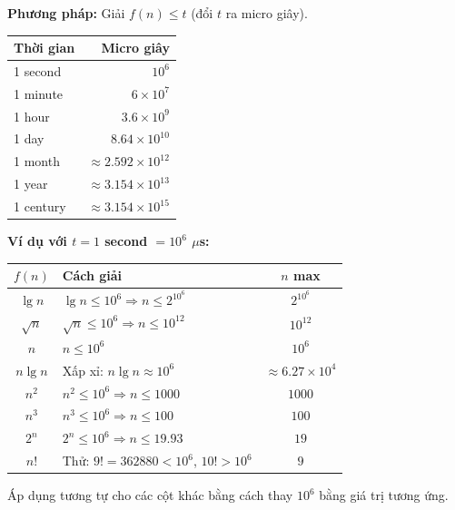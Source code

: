 \documentclass[12pt,a4paper]{article}
\begin{document}
\textbf{Phương pháp:} Giải $f(n) \leq t$ (đổi $t$ ra micro giây).

\begin{notebox}
\begin{center}
\renewcommand{\arraystretch}{1.2}
\begin{tabular}{|l|r|}
\hline
\textbf{Thời gian} & \textbf{Micro giây} \\
\hline
1 second & $10^6$ \\
1 minute & $6 \times 10^7$ \\
1 hour & $3.6 \times 10^9$ \\
1 day & $8.64 \times 10^{10}$ \\
1 month & $\approx 2.592 \times 10^{12}$ \\
1 year & $\approx 3.154 \times 10^{13}$ \\
1 century & $\approx 3.154 \times 10^{15}$ \\
\hline
\end{tabular}
\end{center}
\end{notebox}

\textbf{Ví dụ với $t = 1$ second $= 10^6$ $\mu$s:}

\begin{center}
\renewcommand{\arraystretch}{1.4}
\begin{tabular}{|c|l|c|}
\hline
$f(n)$ & \textbf{Cách giải} & $n$ max \\
\hline
$\lg n$ & $\lg n \leq 10^6 \Rightarrow n \leq 2^{10^6}$ & $2^{10^6}$ \\
\hline
$\sqrt{n}$ & $\sqrt{n} \leq 10^6 \Rightarrow n \leq 10^{12}$ & $10^{12}$ \\
\hline
$n$ & $n \leq 10^6$ & $10^6$ \\
\hline
$n\lg n$ & Xấp xỉ: $n\lg n \approx 10^6$ & $\approx 6.27 \times 10^4$ \\
\hline
$n^2$ & $n^2 \leq 10^6 \Rightarrow n \leq 1000$ & $1000$ \\
\hline
$n^3$ & $n^3 \leq 10^6 \Rightarrow n \leq 100$ & $100$ \\
\hline
$2^n$ & $2^n \leq 10^6 \Rightarrow n \leq 19.93$ & $19$ \\
\hline
$n!$ & Thử: $9! = 362880 < 10^6$, $10! > 10^6$ & $9$ \\
\hline
\end{tabular}
\end{center}

Áp dụng tương tự cho các cột khác bằng cách thay $10^6$ bằng giá trị tương ứng.
\end{document}

